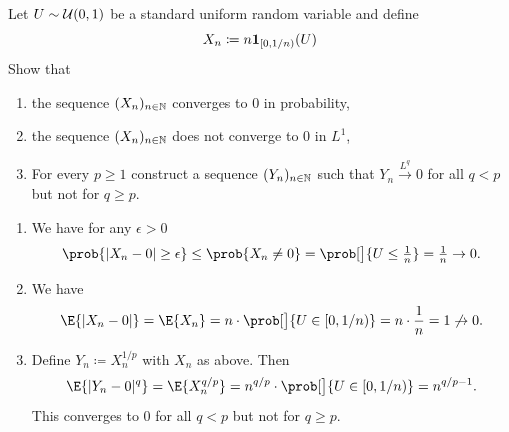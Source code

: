 \documentclass[11pt]{article}
\begin{document}
\maketitle




\begin{exercise}[subtitle={Convergence in probability but not \(L^p\)}]
    \label{ex: convergence in probability but not in Lp}
    Let \(U\sim \mathcal{U}(0,1)\) be a standard uniform random variable and define
    \[
        X_n \coloneq n \ind{[0, 1/n)}(U)
    \]
    Show that
    \begin{enumerate}[label=(\alph*), noitemsep]
        \item\label{it: (conv in prob but not in Lp) in prob}
        the sequence \((X_n)_{n\in \mathbb{N}}\) converges to \(0\) in probability,

        \item\label{it: (conv in prob but not in Lp) not in L1}
        the sequence \((X_n)_{n\in \mathbb{N}}\) does not converge to \(0\) in \(L^1\),

        \item\label{it: (conv in prob but not in Lp) for all q}
        For every \(p \ge 1\) construct a sequence \((Y_n)_{n\in \mathbb{N}}\) such that
        \(Y_n\xrightarrow{L^q} 0\) for all \(q < p\) but not for \(q \ge p\).
    \end{enumerate}
\end{exercise}
\begin{solution}
\begin{enumerate}[wide=0pt]
    \item[\ref{it: (conv in prob but not in Lp) in prob}]
    We have for any \(\epsilon > 0\)
    \[
        \prob{|X_n - 0| \ge \epsilon}
        \le \prob{X_n \neq 0}
        = \prob[\big]{U\le \tfrac1n}
        = \tfrac1n
        \to 0.
    \]

    \item[\ref{it: (conv in prob but not in Lp) not in L1}]
    We have
    \[
        \E{|X_n - 0|}
        = \E{X_n}
        = n \cdot \prob[\big]{U \in [0, 1/n)}
        = n \cdot \frac1n
        = 1 \not\to 0.
    \]            

    \item[\ref{it: (conv in prob but not in Lp) for all q}]
    Define \(Y_n \coloneq X_n^{1/p}\) with \(X_n\) as above. Then
    \[
        \E{|Y_n - 0|^q} = \E{X_n^{q/p}} = n^{q/p} \cdot \prob[\big]{U \in [0, 1/n)} = n^{q/p - 1}.
    \]
    This converges to \(0\) for all \(q < p\) but not for \(q \ge p\).
\end{enumerate}    
\end{solution}
\end{document}
